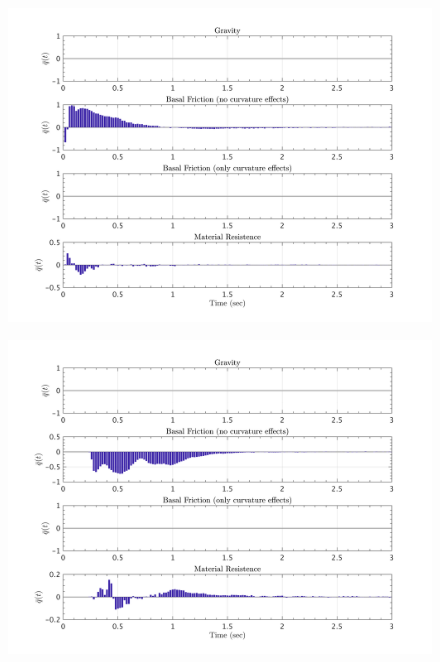 \documentclass{article}
\begin{document}
\begin{figure}[H]
        \begin{minipage}[b]{0.5\linewidth}
                \centering
                \includegraphics[width=1\textwidth]{InclinedPlane/LocalRecords/ContribF1_C_y.png}
                \label{fig:Ramp-Cy1}
        \end{minipage}
        \begin{minipage}[b]{0.5\linewidth}
                \centering
                \includegraphics[width=1\textwidth]{InclinedPlane/LocalRecords/ContribF8_C_y.png}
                \label{fig:Ramp-Cy2}
        \end{minipage}


\end{figure}
\end{document}
